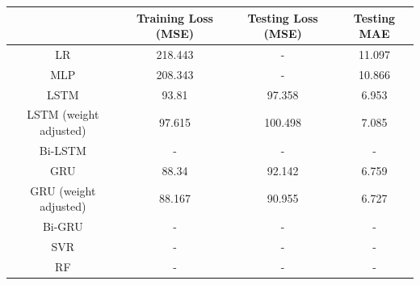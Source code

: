 \begin{center}
    \begin{tabular}{ |c|c|c|c| }
        \hline
        & Training Loss (MSE) & Testing Loss (MSE) & Testing MAE \\
        \hline
        LR                     & 218.443             & -                  & 11.097      \\
        \hline
        MLP                    & 208.343             & -                  & 10.866      \\
        \hline
        LSTM                   & 93.81               & 97.358             & 6.953       \\
        \hline
        LSTM (weight adjusted) & 97.615              & 100.498            & 7.085       \\
        \hline
        Bi-LSTM                & -                   & -                  & -           \\
        \hline
        GRU                    & 88.34               & 92.142             & 6.759       \\
        \hline
        GRU (weight adjusted)  & 88.167              & 90.955             & 6.727       \\
        \hline
        Bi-GRU                 & -                   & -                  & -           \\
        \hline
        SVR                    & -                   & -                  & -           \\
        \hline
        RF                     & -                   & -                  & -           \\
        \hline
    \end{tabular}
\end{center}

